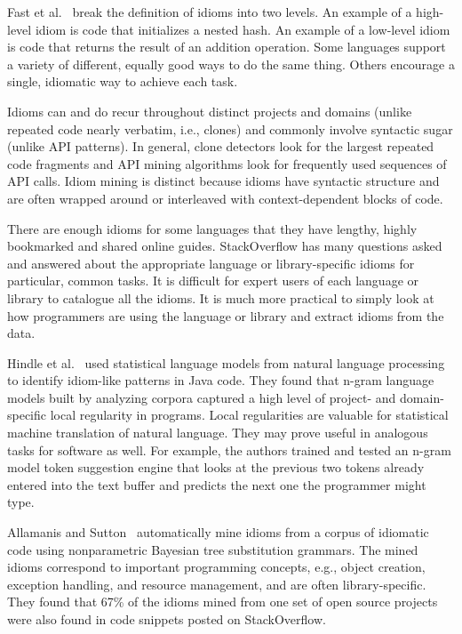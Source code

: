 
Fast et al.~\cite{codex} break the definition of idioms into two levels. An example of a high-level idiom is code that initializes a nested hash. An example of a low-level idiom is code that returns the result of an addition operation. Some languages support a variety of different, equally good ways to do the same thing. Others encourage a single, idiomatic way to achieve each task.

Idioms can and do recur throughout distinct projects and domains (unlike repeated code nearly verbatim, i.e., clones) and commonly involve syntactic sugar (unlike API patterns). In general, clone detectors look for the largest repeated code fragments and API mining algorithms look for frequently used sequences of API calls. Idiom mining is distinct because idioms have syntactic structure and are often wrapped around or interleaved with context-dependent blocks of code.%

There are enough idioms for some languages that they have lengthy, highly bookmarked and shared online guides. StackOverflow has many questions asked and answered about the appropriate language or library-specific idioms for particular, common tasks. It is difficult for expert users of each language or library to catalogue all the idioms. It is much more practical to simply look at how programmers are using the language or library and extract idioms from the data.

Hindle et al.~\cite{Hindle2012} used statistical language models from natural language processing to identify idiom-like patterns in Java code. They found that n-gram language models built by analyzing corpora captured a high level of project- and domain-specific local regularity in programs. Local regularities are valuable for statistical machine translation of natural language. They may prove useful in analogous tasks for software as well. For example, the authors trained and tested an n-gram model token suggestion engine that looks at the previous two tokens already entered into the text buffer and predicts the next one the programmer might type.

Allamanis and Sutton~\cite{allamanis2014mining} automatically mine idioms from a corpus of idiomatic code using nonparametric Bayesian tree substitution grammars. The mined idioms correspond to important programming concepts, e.g., object creation, exception handling, and resource management, and are often library-specific. They found that 67\% of the idioms mined from one set of open source projects were also found in code snippets posted on StackOverflow.

